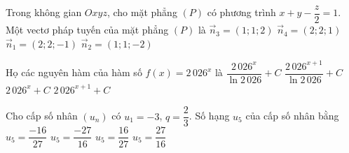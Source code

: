 \begin{ex}%
	Trong không gian $Oxyz$, cho mặt phẳng $(P)$ có phương trình $x+y-\dfrac{z}{2}=1$. Một vectơ pháp tuyến của mặt phẳng $(P)$ là
	\choice
		{$\overrightarrow{n}_3 = (1;1;2)$}
		{$\overrightarrow{n}_4 = (2;2;1)$}
		{\True $\overrightarrow{n}_1 = (2;2;-1)$}
		{$\overrightarrow{n}_2 = (1;1;-2)$}
\end{ex}

\begin{ex}%
	Họ các nguyên hàm của hàm số $f(x)=2\,026^x$ là
	\choice
		{\True $\dfrac{2\,026^x}{\ln 2\,026}+C$}
		{$\dfrac{2\,026^{x+1}}{\ln 2\,026}+C$}
		{$2\,026^x+C$}
		{$2\,026^{x+1}+C$}
\end{ex}

\begin{ex}%
	Cho cấp số nhân $(u_n)$ có $u_1=-3$, $q=\dfrac{2}{3}$. Số hạng $u_5$ của cấp số nhân bằng
	\choice
		{\True $u_5=\dfrac{-16}{27}$}
		{$u_5=\dfrac{-27}{16}$}
		{$u_5=\dfrac{16}{27}$}
		{$u_5=\dfrac{27}{16}$}
\end{ex}


